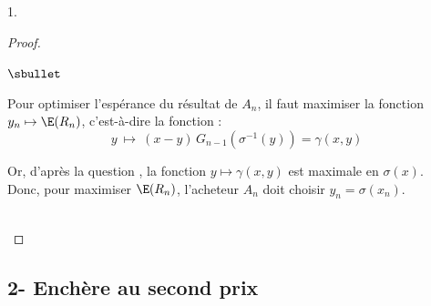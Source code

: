 \begin{noliste}{1.}
  \begin{proof}~
    \begin{noliste}{$\sbullet$}
      \item Pour optimiser l'espérance du résultat de $A_n$, il faut
      maximiser la fonction $y_n \mapsto \E(R_n)$, c'est-à-dire la 
      fonction :
      \[
        y \ \mapsto \ (x-y) \, G_{n-1}(\sigma^{-1}(y)) = \gamma(x,y)
      \]
      
      \item Or, d'après la question , la fonction 
      $y \mapsto \gamma(x,y)$ est maximale en $\sigma(x)$.\\
      Donc, pour maximiser $\E(R_n)$, l'acheteur $A_n$ doit choisir
      $y_n=\sigma(x_n)$.
    \end{noliste}
    
    ~\\[-1.2cm]
  \end{proof}
\end{noliste}



\newpage



\subsection*{2- Enchère au second prix}

